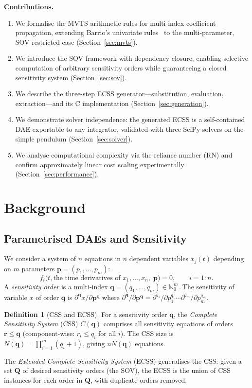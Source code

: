 \documentclass[12pt,a4paper]{article}
\theoremstyle{definition}
\newtheorem{definition}{Definition}[section]
\theoremstyle{plain}
\theoremstyle{remark}
\newcommand{\vp}{\mathbf{p}}
\newcommand{\vq}{\mathbf{q}}
\newcommand{\vQ}{\mathbf{Q}}
\newcommand{\vr}{\mathbf{r}}
\newcommand{\cpp}{C\nolinebreak[4]\hspace{-.05em}\raisebox{.35ex}{\small\textbf{+\!+}}}
\begin{document}
\medskip\noindent\textbf{Contributions.}
\begin{enumerate}[nosep]
  \item We formalise the MVTS arithmetic rules for multi-index coefficient propagation, extending Barrio's univariate rules~\cite{barrio2006sensitivity} to the multi-parameter, SOV-restricted case (Section~\ref{sec:mvts}).
  \item We introduce the SOV framework with dependency closure, enabling selective computation of arbitrary sensitivity orders while guaranteeing a closed sensitivity system (Section~\ref{sec:sov}).
  \item We describe the three-step ECSS generator---substitution, evaluation, extraction---and its \cpp{} implementation (Section~\ref{sec:generation}).
  \item We demonstrate solver independence: the generated ECSS is a self-contained DAE exportable to any integrator, validated with three SciPy solvers on the simple pendulum (Section~\ref{sec:solver}).
  \item We analyse computational complexity via the reliance number (RN) and confirm approximately linear cost scaling experimentally (Section~\ref{sec:performance}).
\end{enumerate}

\section{Background}
\label{sec:background}

\subsection{Parametrised DAEs and Sensitivity}

We consider a system of $n$ equations in $n$ dependent variables $x_j(t)$ depending on $m$ parameters $\vp = (p_1,\dots,p_m)$:
\begin{equation}\label{eq:pDAE}
  f_i\bigl(t, \text{the time derivatives of } x_1,\dots,x_n,\; \vp\bigr) = 0,\qquad i = 1:n.
\end{equation}
A \emph{sensitivity order} is a multi-index $\vq = (q_1,\dots,q_m)\in\mathbb{N}_0^m$. The sensitivity of variable $x$ of order $\vq$ is $\partial^{\vq}x/\partial\vp^{\vq}$ where $\partial^{\vq}/\partial\vp^{\vq} = \partial^{q_1}/\partial p_1^{q_1}\cdots\partial^{q_m}/\partial p_m^{q_m}$.

\begin{definition}[CSS and ECSS]
For a sensitivity order $\vq$, the \emph{Complete Sensitivity System} (CSS) $C(\vq)$ comprises all sensitivity equations of orders $\vr \le \vq$ (component-wise: $r_i \le q_i$ for all $i$). The CSS size is $N(\vq) = \prod_{i=1}^m(q_i+1)$, giving $n N(\vq)$ equations.

The \emph{Extended Complete Sensitivity System} (ECSS) generalises the CSS: given a set $\vQ$ of desired sensitivity orders (the SOV), the ECSS is the union of CSS instances for each order in $\vQ$, with duplicate orders removed.
\end{definition}
\end{document}
